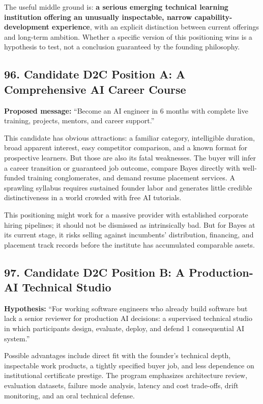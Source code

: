 The useful middle ground is: \textbf{a serious emerging technical learning institution offering an unusually inspectable, narrow capability-development experience}, with an explicit distinction between current offerings and long-term ambition. Whether a specific version of this positioning wins is a hypothesis to test, not a conclusion guaranteed by the founding philosophy.

\subsection*{96. Candidate D2C Position A: A Comprehensive AI Career Course}

\textbf{Proposed message:} ``Become an AI engineer in 6 months with complete live training, projects, mentors, and career support.''

This candidate has obvious attractions: a familiar category, intelligible duration, broad apparent interest, easy competitor comparison, and a known format for prospective learners. But those are also its fatal weaknesses. The buyer will infer a career transition or guaranteed job outcome, compare Bayes directly with well-funded training conglomerates, and demand resume placement services. A sprawling syllabus requires sustained founder labor and generates little credible distinctiveness in a world crowded with free AI tutorials.

This positioning might work for a massive provider with established corporate hiring pipelines; it should not be dismissed as intrinsically bad. But for Bayes at its current stage, it risks selling against incumbents' distribution, financing, and placement track records before the institute has accumulated comparable assets.

\subsection*{97. Candidate D2C Position B: A Production-AI Technical Studio}

\textbf{Hypothesis:} ``For working software engineers who already build software but lack a senior reviewer for production AI decisions: a supervised technical studio in which participants design, evaluate, deploy, and defend 1 consequential AI system.''

Possible advantages include direct fit with the founder's technical depth, inspectable work products, a tightly specified buyer job, and less dependence on institutional certificate prestige. The program emphasizes architecture review, evaluation datasets, failure mode analysis, latency and cost trade-offs, drift monitoring, and an oral technical defense.

